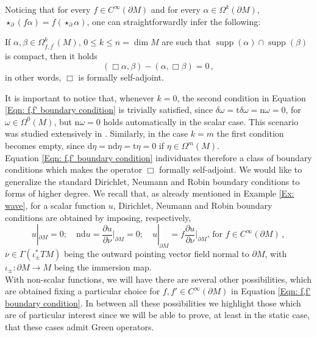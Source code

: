 \noindent Noticing that for every $f\in C^\infty(\partial M)$ and for every $\alpha\in\Omega^k(\partial M)$, $\star_\partial(f\alpha)=f(\star_\partial\alpha)$, one can straightforwardly infer the following:

\begin{lemma}\label{Lemma: boundary condition}
	If $\alpha,\beta\in	\Omega^k_{f,f^\prime}(M)$, $0\leq k\leq n=\dim M$ are such that $\operatorname{supp}(\alpha)\cap\operatorname{supp}(\beta)$ is compact, then it holds 
	$$(\Box\alpha,\beta)-(\alpha,\Box\beta)=0\,,$$
	in other words, $\Box$ is formally self-adjoint.
\end{lemma}

It is important to notice that, whenever $k=0$, the second condition in Equation \eqref{Eqn: f,f' boundary condition} is trivially satisfied, since $\delta\omega=\mathrm{t}\delta\omega=\mathrm{n}\omega=0$, for $\omega\in\Omega^0(M)$, but $\mathrm{n}\omega=0$ holds automatically in the scalar case. This scenario was studied extensively in \cite{Dappiaggi-Drago-Ferreira-19}. Similarly, in the case $k=m$ the first condition becomes empty, since $\mathrm{d}\eta=\mathrm{n}\mathrm{d}\eta=\mathrm{t}\eta=0$ if $\eta\in\Omega^m(M)$.\\

Equation \eqref{Eqn: f,f' boundary condition} individuates therefore a class of boundary conditions which makes the operator $\Box$ formally self-adjoint. We would like to generalize the standard Dirichlet, Neumann and Robin boundary conditions to forms of higher degree. We recall that, as already mentioned in Example \ref{Ex: wave}, for a scalar function $u$, Dirichlet, Neumann and Robin boundary conditions are obtained by imposing, respectively,
\[	u|_{\partial M}=0;\quad \mathrm{n}\mathrm{d}u=\frac{\partial u}{\partial \nu}\Big|_{\partial M}=0;\quad u|_{\partial M}= f \frac{\partial u}{\partial \nu}\Big|_{\partial M},\,\text{for }f\in C^\infty(\partial M)\,,	\]
$\nu\in \Gamma(\iota_{ \pm}^*TM)$ being the outward pointing vector field normal to $\partial M$, with $\iota_{ \pm}:\partial M\to M$ being the immersion map.\\
With non-scalar functions, we will have there are several other possibilities, which are obtained fixing a particular choice for  $f,f'\in C^\infty(\partial M)$ in Equation \eqref{Eqn: f,f' boundary condition}.
In between all these possibilities we highlight those which are of particular interest since we will be able to prove, at least in the static case, that these cases admit Green operators.

